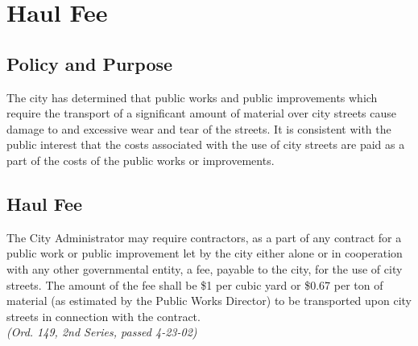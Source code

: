 \section{Haul Fee}
\subsection{Policy and Purpose}
The city has determined that public works and public improvements which require the transport of a significant amount of material over city streets cause damage to and excessive wear and tear of the streets.  It is consistent with the public interest that the costs associated with the use of city streets are paid as a part of the costs of the public works or improvements.
\subsection{Haul Fee}
The City Administrator may require contractors, as a part of any contract for a public work or public improvement let by the city either alone or in cooperation with any other governmental entity, a fee, payable to the city, for the use of city streets.  The amount of the fee shall be \$1 per cubic yard or \$0.67 per ton of material (as estimated by the Public Works Director) to be transported upon city streets in connection with the contract.\\
\emph{(Ord. 149, 2nd Series, passed 4-23-02)}

\setcounter{section}{98}
